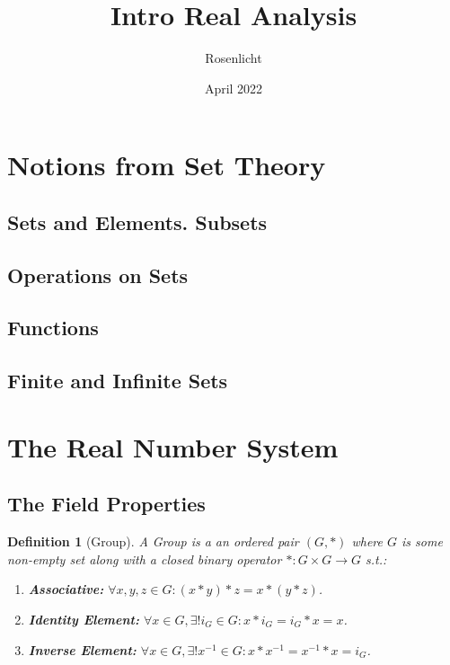 \documentclass{article}
\title{Intro Real Analysis}
\author{Rosenlicht}
\date{April 2022}
\newtheorem{definition}{Definition}[section]
\begin{document}
	
	\maketitle
	\tableofcontents
	
	\section{Notions from Set Theory}
		\subsection{Sets and Elements. Subsets}
		
		\subsection{Operations on Sets}
		
		\subsection{Functions}
		
		\subsection{Finite and Infinite Sets}
	
	\section{The Real Number System}
		\subsection{The Field Properties}
		
			\begin{definition}[Group]
			\label{group}
				A Group is a an ordered pair $(G, *)$ where $G$ is some non-empty set along with a closed binary operator $*\colon G \times G \to G$ s.t.:
				\begin{enumerate}
					\item \textbf{Associative:} $\forall x, y, z \in G: (x * y) * z = x * (y * z)$.
					\item \textbf{Identity Element:} $\forall x \in G, \exists! i_G \in G: x * i_G = i_G * x = x$.
					\item \textbf{Inverse Element:} $\forall x \in G, \exists! x^{-1} \in G: x * x^{-1} = x^{-1} * x = i_G$.
				\end{enumerate}
			\end{definition}
\end{document}
